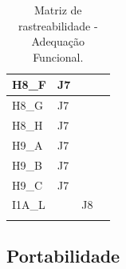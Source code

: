 \begin{longtable}{|l|l|l|l|}
H8\_F                           & J7                                                &                                                  &                                                  \\ \hline
H8\_G                           & J7                                                &                                                  &                                                  \\ \hline
H8\_H                           & J7                                                &                                                  &                                                  \\ \hline
H9\_A                           & J7                                                &                                                  &                                                  \\ \hline
H9\_B                           & J7                                                &                                                  &                                                  \\ \hline
H9\_C                           & J7                                                &                                                  &                                                  \\ \hline
I1A\_L                           &                                                 & J8                                                  &                                                  \\ \hline

\caption{Matriz de rastreabilidade - Adequação Funcional.}
\end{longtable}

\subsection{Portabilidade}

